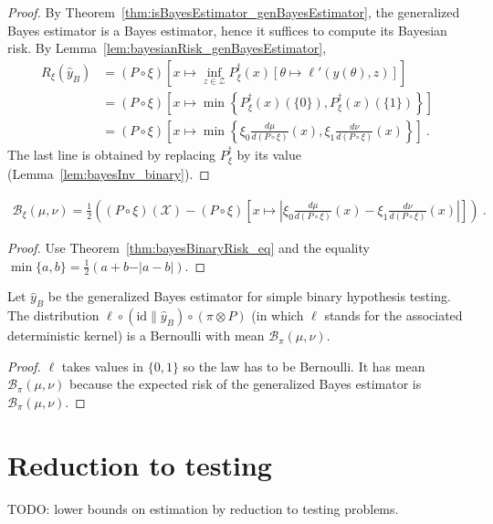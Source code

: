 \begin{proof}%
{}
By Theorem~\ref{thm:isBayesEstimator_genBayesEstimator}, the generalized Bayes estimator is a Bayes estimator, hence it suffices to compute its Bayesian risk.
By Lemma~\ref{lem:bayesianRisk_genBayesEstimator},
\begin{align*}
R_\xi(\hat{y}_B)
&= (P \circ \xi)\left[x \mapsto \inf_{z \in \mathcal Z} P_\xi^\dagger(x) \left[\theta \mapsto \ell'(y(\theta), z)\right]\right]
\\
&= (P \circ \xi)\left[x \mapsto \min \left\{P_\xi^\dagger(x)(\{0\}), P_\xi^\dagger(x)(\{1\})\right\}\right]
\\
&= (P \circ \xi)\left[x \mapsto \min \left\{\xi_0\frac{d \mu}{d(P \circ \xi)}(x), \xi_1\frac{d \nu}{d(P \circ \xi)}(x)\right\}\right]
\: .
\end{align*}
The last line is obtained by replacing $P_\xi^\dagger$ by its value (Lemma~\ref{lem:bayesInv_binary}).
\end{proof}

\begin{corollary}
  \label{cor:bayesBinaryRisk_eq_abs}
  \begin{align*}
  \mathcal B_\xi(\mu, \nu) = \frac{1}{2}\left((P \circ \xi)(\mathcal X) -  (P \circ \xi)\left[x \mapsto \left\vert \xi_0\frac{d \mu}{d(P \circ \xi)}(x) - \xi_1\frac{d \nu}{d(P \circ \xi)}(x)\right\vert\right] \right)
  \: .
  \end{align*}
\end{corollary}

\begin{proof}%
{}
Use Theorem~\ref{thm:bayesBinaryRisk_eq} and the equality $\min\{a,b\} = \frac{1}{2}(a + b - \vert a - b \vert)$.
\end{proof}


\begin{lemma}
  \label{lem:bayesBinaryRisk_bernoulli}
  Let $\hat{y}_B$ be the generalized Bayes estimator for simple binary hypothesis testing.
  The distribution $\ell \circ (\mathrm{id} \parallel \hat{y}_B) \circ (\pi \otimes P)$ (in which $\ell$ stands for the associated deterministic kernel) is a Bernoulli with mean $\mathcal B_\pi(\mu, \nu)$.
\end{lemma}

\begin{proof}%
{}
$\ell$ takes values in $\{0,1\}$ so the law has to be Bernoulli. It has mean $\mathcal B_\pi(\mu, \nu)$ because the expected risk of the generalized Bayes estimator is $\mathcal B_\pi(\mu, \nu)$.
\end{proof}



\section{Reduction to testing}

TODO: lower bounds on estimation by reduction to testing problems.
